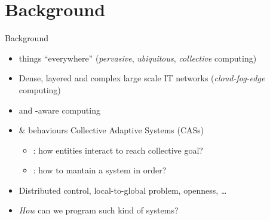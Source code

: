 \documentclass[9pt, aspectratio=169, handout]{beamer}
\begin{document}
\begin{frame}[plain]
\titlepage
\end{frame}

\section{Background}
\begin{frame}{Background}
  \begin{card}
    \begin{itemize}
      \item {} things ``everywhere'' (\emph{pervasive}, \emph{ubiquitous}, \emph{collective} computing)
      \item Dense, layered and complex large scale IT networks (\emph{cloud-fog-edge} computing)
      \item {} and -aware computing
    \end{itemize}
  \end{card}
  \begin{alarm}[Challenges]
    \begin{itemize}
      \item {} \&  behaviours \emph{\faArrowRight} Collective Adaptive Systems (CASs)
      \begin{itemize}
        \item {}: how entities interact to reach collective goal?
        \item {}: how to mantain a system in order?
      \end{itemize}
      \item Distributed control, local-to-global problem, openness, \dots
      \item \emph{How} can we program such kind of systems?
    \end{itemize}
  \end{alarm}
\end{frame}
\end{document}
